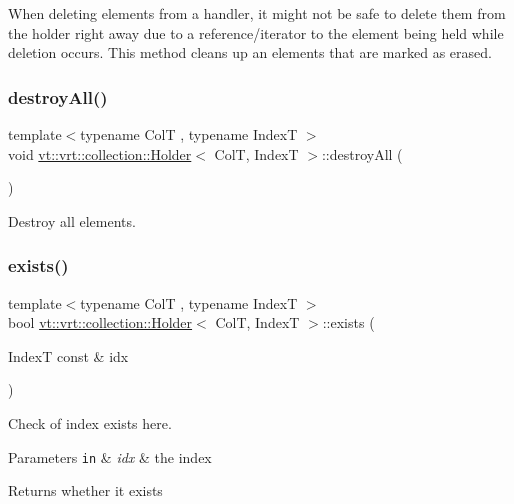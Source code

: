 When deleting elements from a handler, it might not be safe to delete them from the holder right away due to a reference/iterator to the element being held while deletion occurs. This method cleans up an elements that are marked as erased. \mbox{\label{structvt_1_1vrt_1_1collection_1_1_holder_ae4bd4f8f82713c8b4b2ea0b472fe7192}} 
\subsubsection{\texorpdfstring{destroy\+All()}{destroyAll()}}
{\footnotesize\ttfamily template$<$typename ColT , typename IndexT $>$ \\
void \hyperlink{structvt_1_1vrt_1_1collection_1_1_holder}{vt\+::vrt\+::collection\+::\+Holder}$<$ ColT, IndexT $>$\+::destroy\+All (\begin{DoxyParamCaption}{ }\end{DoxyParamCaption})}



Destroy all elements. 

\mbox{\label{structvt_1_1vrt_1_1collection_1_1_holder_a15b1f2f386c124191f01400fecf24464}} 
\subsubsection{\texorpdfstring{exists()}{exists()}}
{\footnotesize\ttfamily template$<$typename ColT , typename IndexT $>$ \\
bool \hyperlink{structvt_1_1vrt_1_1collection_1_1_holder}{vt\+::vrt\+::collection\+::\+Holder}$<$ ColT, IndexT $>$\+::exists (\begin{DoxyParamCaption}\item[{IndexT const \&}]{idx }\end{DoxyParamCaption})}



Check of index exists here. 


\begin{DoxyParams}[1]{Parameters}
\mbox{\tt in}  & {\em idx} & the index\\
\hline
\end{DoxyParams}
\begin{DoxyReturn}{Returns}
whether it exists 
\end{DoxyReturn}
\mbox{\label{structvt_1_1vrt_1_1collection_1_1_holder_a8d4a61cc04310a7c998fe37695bbbd6b}} 
